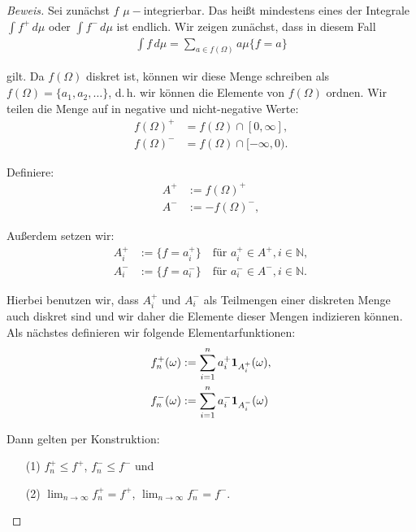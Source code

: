 \documentclass[10pt]{article}
\newcommand{\N}{\mathbb{N}}
\begin{document}
\begin{proof}[Beweis]
  Sei zunächst $f$ $\mu-$integrierbar. Das heißt mindestens eines der Integrale 
  $\int f^{+} \,d\mu$ oder $\int f^{-} \,d\mu$ ist endlich.
  Wir zeigen zunächst, dass in diesem Fall
  \begin{align*}
    \int f \,d\mu = \sum_{a\in f(\Omega)} a\mu\{f=a\}
  \end{align*}

  gilt. Da $f(\Omega)$ diskret ist, können wir diese Menge schreiben als 
  $f(\Omega) = \{ a_1,a_2,\dots \}$, d.\,h. wir können die Elemente von $f(\Omega)$  
  ordnen. Wir teilen die Menge auf in negative und nicht-negative Werte:
  \begin{align*}
    f(\Omega)^{+} &= f(\Omega)\cap[0,\infty], \\
    f(\Omega)^{-} &= f(\Omega)\cap[-\infty,0).
  \end{align*}
  
  Definiere:
  \begin{align*}
    A^{+} &:= f(\Omega)^{+} \\
    A^{-} &:= -f(\Omega)^{-},
  \end{align*}

  Außerdem setzen wir:
  \begin{align*}
    A_i^{+} &:= \{ f = a_i^+ \} \quad\text{für $a_i^+\in A^+, i\in\N$}, \\
    A_i^{-} &:= \{ f = a_i^- \} \quad\text{für $a_i^-\in A^-, i\in\N$}.
  \end{align*}

  Hierbei benutzen wir, dass $A_i^{+}$ und $A_i^{-}$ als Teilmengen einer diskreten Menge 
  auch diskret sind und wir daher die Elemente dieser Mengen indizieren können.  
  Als nächstes definieren wir folgende Elementarfunktionen:
  \begin{align*}
      f^{+}_n(\omega) &:= \sum_{i=1}^{n} a_i^+ \text{\textbf{1}}_{A^{+}_i}(\omega), \\                                                               
      f^{-}_n(\omega) &:= \sum_{i=1}^{n} a_i^- \text{\textbf{1}}_{A^{-}_i}(\omega)                                    
  \end{align*}

  Dann gelten per Konstruktion:
  \begin{itemize}
    \item[(1)] $f_n^+ \leq f^{+}$, $f_n^- \leq f^{-}$ \quad und
    \item[(2)] $\lim_{n\to\infty} f_n^{+} = f^{+}$, $\lim_{n\to\infty} f_n^{-} = f^{-}$.
  \end{itemize}


\end{proof}
\end{document}
